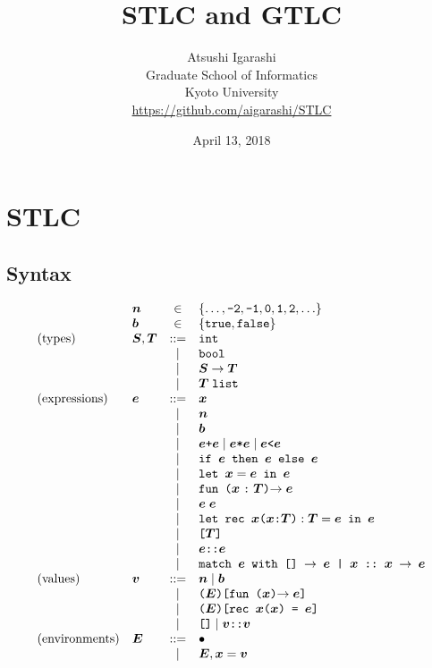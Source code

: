 \documentclass[11pt]{jarticle}
\title{STLC and GTLC}
\author{Atsushi Igarashi\\
  Graduate School of Informatics \\
  Kyoto University \\
 \url{https://github.com/aigarashi/STLC} \\
}
\date{April 13, 2018}
\def\mv#1{\mbox{\boldmath $#1$}}
\begin{document}
\maketitle

\section{STLC}
\subsection{Syntax}

\[
  \begin{array}{llcl}
    & \mv{n} &\in& \set{\ldots, \texttt{-2}, \texttt{-1}, \texttt{0}, \texttt{1}, \texttt{2}, \ldots} \\
    & \mv{b} &\in& \set{\texttt{true}, \texttt{false}} \\
\mbox{(types)} & \mv{S}, \mv{T} & ::= & \nat \\
&& | & \bool \\
    && | & \mv{S} \imp \mv{T} \\
    && | & \mv{T}\; \listty \\
    \mbox{(expressions)} & \mv{e} & ::= & \mv{x} \\
    && | & \mv{n} \\
    && | & \mv{b} \\
    && | & \mv{e} \texttt{+} \mv{e} \mid \mv{e} \texttt{*} \mv{e} \mid \mv{e} \texttt{<} \mv{e} \\
    && | & \bif{\mv{e}}{\mv{e}}{\mv{e}} \\
    && | & \texttt{let } \mv{x} = \mv{e} \texttt{ in } \mv{e} \\
    && | & \abs{\mv{x}}{\mv{T}}{\mv{e}} \\
    && | & \mv{e}\; \mv{e} \\
    && | & \texttt{let rec $\mv{x}$($\mv{x}$:$\mv{T}$)} : \mv{T} = \mv{e} \texttt{ in } \mv{e} \\
    && | & \texttt{[$\mv{T}$]} \\
    && | & \mv{e} \texttt{::} \mv{e} \\
    && | & \matchl{\mv{e}}{\mv{e}}{\mv{x}}{\mv{x}}{\mv{e}} \\
    \mbox{(values)} & \mv{v} & ::= & \mv{n} \mid \mv{b} \\
    && | & \texttt{(\mv{E})[$\absunty{\mv{x}}{\mv{e}}$]} \\
    && | & \texttt{(\mv{E})[rec $\mv{x}$($\mv{x}$) = $\mv{e}$]} \\
    && | & \texttt{[]} \mid \mv{v} \texttt{::} \mv{v} \\
\mbox{(environments)}    
    &\mv{E}& ::= & \bullet \\ && | & \mv{E}, \mv{x} = \mv{v}
\end{array}
\]
\end{document}
